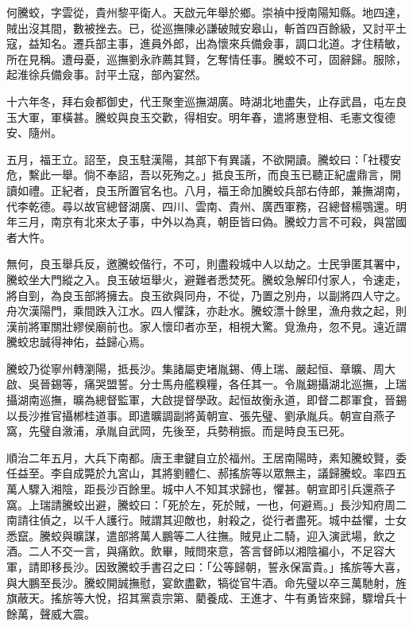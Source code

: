 
\begin{pinyinscope}
何騰蛟，字雲從，貴州黎平衛人。天啟元年舉於鄉。崇禎中授南陽知縣。地四達，賊出沒其間，數被挫去。已，從巡撫陳必謙破賊安皋山，斬首四百餘級，又討平土寇，益知名。遷兵部主事，進員外郎，出為懷來兵備僉事，調口北道。才住精敏，所在見稱。遭母憂，巡撫劉永祚薦其賢，乞奪情任事。騰蛟不可，固辭歸。服除，起淮徐兵備僉事。討平土寇，部內宴然。

十六年冬，拜右僉都御史，代王聚奎巡撫湖廣。時湖北地盡失，止存武昌，屯左良玉大軍，軍橫甚。騰蛟與良玉交歡，得相安。明年春，遣將惠登相、毛憲文復德安、隨州。

五月，福王立。詔至，良玉駐漢陽，其部下有異議，不欲開讀。騰蛟曰：「社稷安危，繫此一舉。倘不奉詔，吾以死殉之。」抵良玉所，而良玉已聽正紀盧鼎言，開讀如禮。正紀者，良玉所置官名也。八月，福王命加騰蛟兵部右侍郎，兼撫湖南，代李乾德。尋以故官總督湖廣、四川、雲南、貴州、廣西軍務，召總督楊鶚還。明年三月，南京有北來太子事，中外以為真，朝臣皆曰偽。騰蛟力言不可殺，與當國者大忤。

無何，良玉舉兵反，邀騰蛟偕行，不可，則盡殺城中人以劫之。士民爭匿其署中，騰蛟坐大門縱之入。良玉破垣舉火，避難者悉焚死。騰蛟急解印付家人，令速走，將自剄，為良玉部將擁去。良玉欲與同舟，不從，乃置之別舟，以副將四人守之。舟次漢陽門，乘間跌入江水。四人懼誅，亦赴水。騰蛟漂十餘里，漁舟救之起，則漢前將軍關壯繆侯廟前也。家人懷印者亦至，相視大驚。覓漁舟，忽不見。遠近謂騰蛟忠誠得神佑，益歸心焉。

騰蛟乃從寧州轉瀏陽，抵長沙。集諸屬吏堵胤錫、傅上瑞、嚴起恒、章曠、周大啟、吳晉錫等，痛哭盟誓。分士馬舟艦糗糧，各任其一。令胤錫攝湖北巡撫，上瑞攝湖南巡撫，曠為總督監軍，大啟提督學政。起恒故衡永道，即督二郡軍食，晉錫以長沙推官攝郴桂道事。即遣曠調副將黃朝宣、張先璧、劉承胤兵。朝宣自燕子窩，先璧自漵浦，承胤自武岡，先後至，兵勢稍振。而是時良玉已死。

順治二年五月，大兵下南都。唐王聿鍵自立於福州。王居南陽時，素知騰蛟賢，委任益至。李自成斃於九宮山，其將劉體仁、郝搖旂等以眾無主，議歸騰蛟。率四五萬人驟入湘陰，距長沙百餘里。城中人不知其求歸也，懼甚。朝宣即引兵還燕子窩。上瑞請騰蛟出避，騰蛟曰：「死於左，死於賊，一也，何避焉。」長沙知府周二南請往偵之，以千人護行。賊謂其迎敵也，射殺之，從行者盡死。城中益懼，士女悉竄。騰蛟與曠謀，遣部將萬人鵬等二人往撫。賊見止二騎，迎入演武場，飲之酒。二人不交一言，與痛飲。飲畢，賊問來意，答言督師以湘陰褊小，不足容大軍，請即移長沙。因致騰蛟手書召之曰：「公等歸朝，誓永保富貴。」搖旂等大喜，與大鵬至長沙。騰蛟開誠撫慰，宴飲盡歡，犒從官牛酒。命先璧以卒三萬馳射，旌旗蔽天。搖旂等大悅，招其黨袁宗第、藺養成、王進才、牛有勇皆來歸，驟增兵十餘萬，聲威大震。


\end{pinyinscope}
